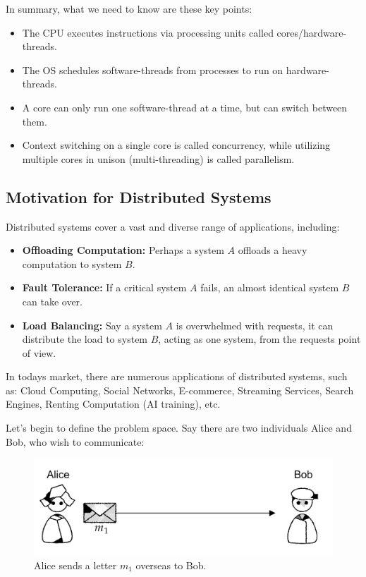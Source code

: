 \noindent
In summary, what we need to know are these key points:
\begin{itemize}
    \item The CPU executes instructions via processing units called cores/hardware-threads.
    \item The OS schedules software-threads from processes to run on hardware-threads.
    \item A core can only run one software-thread at a time, but can switch between them.
    \item Context switching on a single core is called concurrency, while utilizing multiple cores in unison (multi-threading) is called parallelism.
\end{itemize}


\newpage 

\noindent
\subsection{Motivation for Distributed Systems}

\noindent
Distributed systems cover a vast and diverse range of applications, including:
\begin{itemize}
    \item \textbf{Offloading Computation:} Perhaps a system $A$ offloads a heavy computation to system $B$.
    \item \textbf{Fault Tolerance:} If a critical system $A$ fails, an almost identical system $B$ can take over.
    \item \textbf{Load Balancing:} Say a system $A$ is overwhelmed with requests, it can distribute the load to system $B$, acting as 
    one system, from the requests point of view.
\end{itemize}
In todays market, there are numerous applications of distributed systems, such as:
Cloud Computing, Social Networks, E-commerce, Streaming Services, Search Engines, Renting Computation (AI training), etc.

Let's begin to define the problem space. Say there are 
two individuals Alice and Bob, who wish to communicate:\\
\begin{figure}[h]
    \centering
    \includegraphics[width=.8\textwidth]{./Sections/high/com.png}
    \caption{Alice sends a letter $m_1$ overseas to Bob.}
\end{figure}

